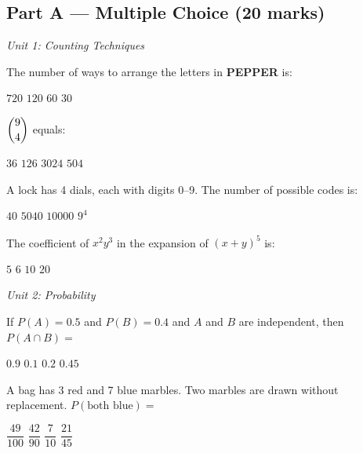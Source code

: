 \documentclass[addpoints]{exam}
\begin{document}
\newpage
\begin{questions}

\section*{Part A --- Multiple Choice (20 marks)}
\vspace{3mm}
\noindent\textit{Unit 1: Counting Techniques}
\vspace{3mm}

\question[1] The number of ways to arrange the letters in \textbf{PEPPER} is:
\begin{choices}
    \choice $720$
    \choice $120$
    \correctchoice $60$
    \choice $30$
\end{choices}

\question[1] $\dbinom{9}{4}$ equals:
\begin{choices}
    \choice $36$
    \correctchoice $126$
    \choice $3024$
    \choice $504$
\end{choices}

\question[1] A lock has 4 dials, each with digits 0--9. The number of possible codes is:
\begin{choices}
    \choice $40$
    \choice $5040$
    \correctchoice $10000$
    \choice $9^4$
\end{choices}

\question[1] The coefficient of $x^2y^3$ in the expansion of $(x+y)^5$ is:
\begin{choices}
    \choice $5$
    \choice $6$
    \correctchoice $10$
    \choice $20$
\end{choices}

\vspace{3mm}
\noindent\textit{Unit 2: Probability}
\vspace{3mm}

\question[1] If $P(A) = 0.5$ and $P(B) = 0.4$ and $A$ and $B$ are independent, then
$P(A \cap B) =$
\begin{choices}
    \choice $0.9$
    \choice $0.1$
    \correctchoice $0.2$
    \choice $0.45$
\end{choices}

\question[1] A bag has 3 red and 7 blue marbles. Two marbles are drawn without replacement.
$P(\text{both blue}) =$
\begin{choices}
    \choice $\dfrac{49}{100}$
    \correctchoice $\dfrac{42}{90}$
    \choice $\dfrac{7}{10}$
    \choice $\dfrac{21}{45}$
\end{choices}


\end{questions}
\end{document}
